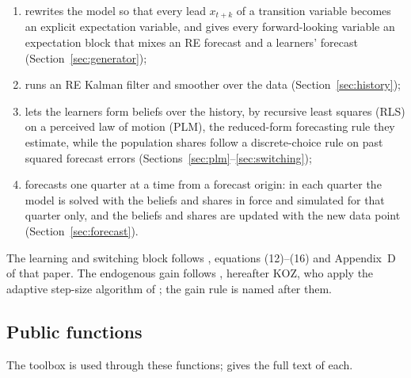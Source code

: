 \documentclass[11pt,a4paper]{article}
\begin{document}
\begin{enumerate}[nosep]
  \item rewrites the model so that every lead $x_{t+k}$ of a transition variable becomes an
        explicit expectation variable, and gives every forward-looking variable an expectation
        block that mixes an RE forecast and a learners' forecast (Section~\ref{sec:generator});
  \item runs an RE Kalman filter and smoother over the data (Section~\ref{sec:history});
  \item lets the learners form beliefs over the history, by recursive least squares (RLS) on
        a perceived law of motion (PLM), the reduced-form forecasting rule they estimate, while the population shares follow a discrete-choice
        rule on past squared forecast errors (Sections~\ref{sec:plm}--\ref{sec:switching});
  \item forecasts one quarter at a time from a forecast origin: in each quarter the model is
        solved with the beliefs and shares in force and simulated for that quarter only, and the
        beliefs and shares are updated with the new data point (Section~\ref{sec:forecast}).
\end{enumerate}

The learning and switching block follows \citet{ozden2025}, equations (12)--(16) and
Appendix~D of that paper. The endogenous gain follows \citet*[eq.~9]{koz2024}, hereafter KOZ, who apply the
adaptive step-size algorithm of \citet{kostyshyna2012}; the gain rule  is named after
them.

\subsection{Public functions}\label{sec:functions}

The toolbox is used through these functions;  gives the full text of each.
\end{document}
